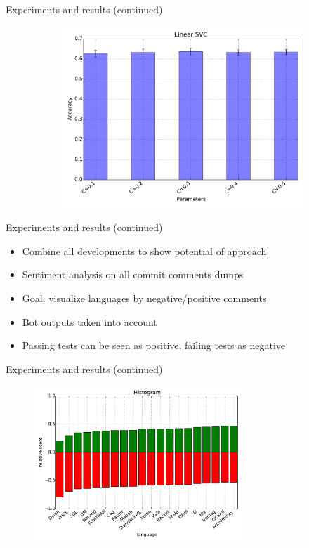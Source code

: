 \documentclass[t,11pt]{beamer}
\begin{document}
\begin{frame}[fragile]{Experiments and results (continued)}
\begin{figure}
\begin{subfigure}[b]{0.4\textwidth}
      \includegraphics[width=\textwidth]{../plots/experiment_results-Linear_SVC.pdf}
    \end{subfigure}
  \end{figure}
\end{frame}

\begin{frame}[fragile]{Experiments and results (continued)}
\begin{itemize}
  \item Combine all developments to show potential of approach
  \item Sentiment analysis on all commit comments dumps
  \item Goal: visualize languages by negative/positive comments
  \item Bot outputs taken into account
  \item Passing tests can be seen as positive, failing tests as negative
\end{itemize}
\end{frame}

\begin{frame}[fragile]{Experiments and results (continued)}
  \begin{figure}
    \centering
    \includegraphics[width=0.7\textwidth]{../plots/all-group-neg.pdf}
  \end{figure}
\end{frame}
\end{document}
